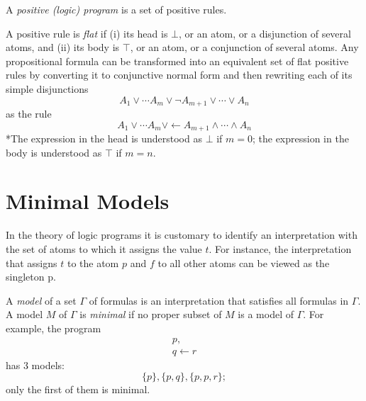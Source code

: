 \documentclass[12pt]{article}
\begin{document}
A \textit{positive (logic) program} is a set of positive rules. 

A positive rule is \textit{flat} if (i) its head is $\bot$, or an atom, or a disjunction of several atoms, and (ii) its body is $\top$, or an atom, or a conjunction of several atoms. Any propositional formula can be transformed into an equivalent set of flat positive rules by converting it to conjunctive normal form and then rewriting each of its simple disjunctions
\begin{equation*}
A_1 \vee \cdots A_m \vee \neg A_{m + 1} \vee \cdots \vee A_n
\end{equation*}
as the rule
\begin{equation*}
A_1 \vee \cdots A_m \vee \leftarrow A_{m + 1} \wedge \cdots \wedge A_n
\end{equation*}
*The expression in the head is understood as $\bot$ if $m = 0$; the expression in the body is understood as $\top$ if $m = n$. 

\section*{Minimal Models \colorbox{yellow}{}}
In the theory of logic programs it is customary to identify an interpretation with the set of atoms to which it assigns the value $t$. For instance, the interpretation that assigns $t$ to the atom $p$ and $f$ to all other atoms can be viewed as the singleton {p}. 

A \textit{model} of a set $\Gamma$ of formulas is an interpretation that satisfies all formulas in $\Gamma$. A model $M$ of $\Gamma$ is \textit{minimal} if no proper subset of $M$ is a model of $\Gamma$. For example, the program
\begin{equation}
\begin{gathered}
p, \\
q \leftarrow r
\end{gathered}
\end{equation}
has 3 models:
\begin{equation*}
 \{p\}, \{p, q\}, \{p, p, r\};
\end{equation*}
only the first of them is minimal. 
\end{document}
